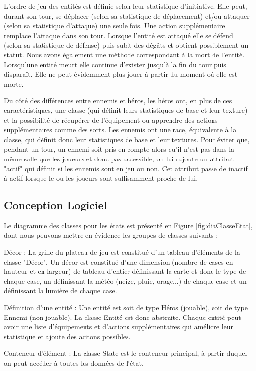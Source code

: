 \documentclass[a4paper,12pt]{article}
\begin{document}
L'ordre de jeu des entités est définie selon leur statistique d'initiative. Elle peut, durant son tour, se déplacer (selon sa statistique de déplacement) et/ou attaquer (selon sa statistique d'attaque) une seule fois. Une action supplémentaire remplace l'attaque dans son tour. Lorsque l'entité est attaqué elle se défend (selon sa statistique de défense) puis subit des dégâts et obtient possiblement un statut. Nous avons également une méthode correspondant à la mort de l'entité. Lorsqu'une entité meurt elle continue d'exister jusqu'à la fin du tour puis disparaît. Elle ne peut évidemment plus jouer à partir du moment où elle est morte.

Du côté des différences entre ennemis et héros, les héros ont, en plus de ces caractéristiques, une classe (qui définit leurs statistiques de base et leur texture) et la possibilité de récupérer de l'équipement ou apprendre des actions supplémentaires comme des sorts. Les ennemis ont une race, équivalente à la classe, qui définit donc leur statistiques de base et leur textures. Pour éviter que, pendant un tour, un ennemi soit pris en compte alors qu'il n'est pas dans la même salle que les joueurs et donc pas accessible, on lui rajoute un attribut "actif" qui définit si les ennemis sont en jeu ou non. Cet attribut passe de inactif à actif lorsque le ou les joueurs sont suffisamment proche de lui.


\subsection{Conception Logiciel}

Le diagramme des classes pour les états est présenté en Figure \ref{fig:diaClasseEtat}, dont nous pouvons mettre en évidence les groupes de classes suivants :

Décor : La grille du plateau de jeu est constitué d'un tableau d'éléments de la classe "Décor". Un décor est constitué d'une dimension (nombre de cases en hauteur et en largeur) de tableau d'entier définissant la carte et donc le type de chaque case, un définissant la météo (neige, pluie, orage...) de chaque case et un définissant la lumière de chaque case.

Définition d'une entité : Une entité est soit de type Héros (jouable), soit de type Ennemi (non-jouable). La classe Entité est donc abstraite. Chaque entité peut avoir une liste d'équipements et d'actions supplémentaires qui améliore leur statistique et ajoute des acitons possibles.

Conteneur d’élément :  La classe State est le conteneur principal, à partir duquel on peut accéder à toutes les données de l’état.
\end{document}
